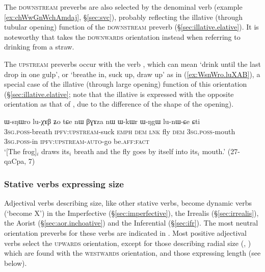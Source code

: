 The \textsc{downstream} preverbs are also selected by the denominal verb  (example \ref{ex:chWwGnWchAmdaj}, §\ref{sec:svc}), probably reflecting the illative (through tubular opening) function of the \textsc{downstream} preverb (§\ref{sec:illative.elative}). It is noteworthy that  takes the \textsc{downwards} orientation instead when referring to drinking from a straw.


The \textsc{upstream} preverbs occur with the verb , which can mean `drink until the last drop in one gulp', or `breathe in, suck up, draw up' as in (\ref{ex:WsnWro.luXAB}), a special case of the illative  (through large opening) function of this orientation (§\ref{sec:illative.elative}; note that the illative is expressed with the opposite orientation as that of , due to the difference of the shape of the opening).

\begin{exe}
\ex \label{ex:WsnWro.luXAB}
\gll ɯ-sŋɯro lu-χɤβ ʑo tɕe nɯ βɣɤza nɯ ɯ-kɯr ɯ-ŋgɯ lu-nɯ-ɕe ɕti \\
\textsc{3sg}.\textsc{poss}-breath \textsc{ipfv}:\textsc{upstream}-suck \textsc{emph} \textsc{dem} \textsc{lnk} fly \textsc{dem} \textsc{3sg}.\textsc{poss}-mouth \textsc{3sg}.\textsc{poss}-in \textsc{ipfv}:\textsc{upstream}-\textsc{auto}-go be.\textsc{aff}:\textsc{fact} \\
\glt `[The frog]$_i$ draws its$_i$ breath and the fly goes by itself into its$_i$ mouth.' (27-qaCpa, 7)
\end{exe}

\subsubsection{Stative verbs expressing size} \label{sec:preverb.adjectives.size}
Adjectival verbs describing size, like other stative verbs, become dynamic verbs (`become X') in the Imperfective (§\ref{sec:imperfective}), the Irrealis (§\ref{sec:irrealis}), the Aorist (§\ref{sec:aor.inchoative}) and the Inferential (§\ref{sec:ifr}). The most neutral orientation preverbs for these verbs are indicated in . Most positive adjectival verbs select the \textsc{upwards} orientation, except for those describing radial size (, ) which are  found with the \textsc{westwards} orientation, and those expressing length (see below).

